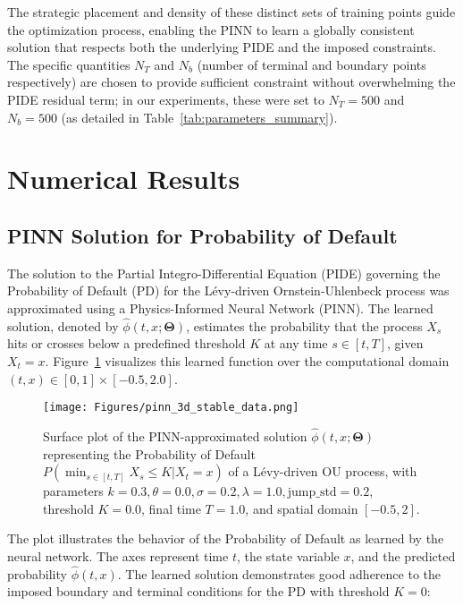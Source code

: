 \documentclass[11pt,twoside,openright]{report}
\begin{document}
The strategic placement and density of these distinct sets of training points guide the optimization process, enabling the PINN to learn a globally consistent solution that respects both the underlying PIDE and the imposed constraints. The specific quantities $N_T$ and $N_b$ (number of terminal and boundary points respectively) are chosen to provide sufficient constraint without overwhelming the PIDE residual term; in our experiments, these were set to $N_T=500$ and $N_b=500$ (as detailed in Table~\ref{tab:parameters_summary}).

\section{Numerical Results} %
\subsection{PINN Solution for Probability of Default}
\label{sec:pinn_pd_solution_results} %
 
The solution to the Partial Integro-Differential Equation (PIDE) governing the Probability of Default (PD) for the Lévy-driven Ornstein-Uhlenbeck process was approximated using a Physics-Informed Neural Network (PINN). The learned solution, denoted by $\hat{\phi}(t, x; \mathbf{\Theta})$, estimates the probability that the process $X_s$ hits or crosses below a predefined threshold $K$ at any time $s \in [t, T]$, given $X_t = x$. Figure~\ref{fig:pinn_levy_ou_pd_solution} visualizes this learned function over the computational domain $(t, x) \in [0, 1] \times [-0.5, 2.0]$.
 
\begin{figure}[htbp]
    \centering
    \texttt{[image: Figures/pinn\_3d\_stable\_data.png]} %
    \caption{Surface plot of the PINN-approximated solution $\hat{\phi}(t, x; \mathbf{\Theta})$ representing the Probability of Default $P(\min_{s \in [t, T]} X_s \le K | X_t = x)$ of a Lévy-driven OU process, with parameters $k=0.3, \theta=0.0, \sigma=0.2, \lambda=1.0, \text{jump\_std}=0.2$, threshold $K=0.0$, final time $T=1.0$, and spatial domain $[-0.5, 2]$.}
    \label{fig:pinn_levy_ou_pd_solution} %
\end{figure}
 
The plot illustrates the behavior of the Probability of Default as learned by the neural network. The axes represent time $t$, the state variable $x$, and the predicted probability $\hat{\phi}(t, x)$. The learned solution demonstrates good adherence to the imposed boundary and terminal conditions for the PD with threshold $K=0$:
 
\end{document}
